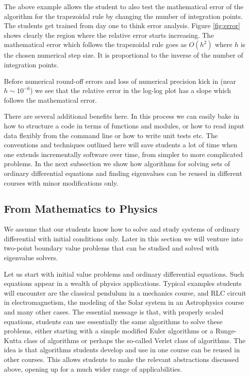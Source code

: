 \documentclass[graybox,envcountchap,sectrefs]{svmult}
\begin{document}
The above example allows the student to also test the mathematical
error of the algorithm for the trapezoidal rule by changing the number
of integration points. The students get trained from day one to think
error analysis. Figure \ref{fig:error}  shows clearly the region where the
relative error starts increasing.  The mathematical error which
follows the trapezoidal rule goes as $O(h^2)$ where $h$ is the chosen
numerical step size. It is proportional to the inverse of the number of integration points.

Before numerical round-off errors and loss of
numerical precision kick in (near $h\sim 10^{-6}$) we see that the
relative error in the log-log plot has a slope which follows the
mathematical error.

There are several additional benefits here. In
this process we can easily bake in how to structure a code in terms of
functions and modules, or how to read input data flexibly from the
command line or how to write unit tests etc.  The conventions and
techniques outlined here will save students a lot of time when one
extends incrementally software over time, from simpler to more
complicated problems. In the next subsection we show how algorithms
for solving sets of ordinary differential equations and finding
eigenvalues can be reused in different courses with minor
modifications only.



\subsection{From Mathematics to Physics}

We assume that our students know how to solve and study systems of
ordinary differential with initial conditions only. Later in this
section we will venture into two-point boundary value problems that
can be studied and solved with eigenvalue solvers.

Let us start with initial value problems and ordinary differential
equations. Such equations appear in a wealth of physics
applications. Typical examples students will encounter are the
classical pendulum in a mechanics course, and RLC circuit in
electromagnetism, the modeling of the Solar system in an Astrophysics
course and many other cases.  The essential message is that, with
properly scaled equations, students can use essentially the
same algorithms to solve these problems, either starting with
a simple modified Euler algorithms or a Runge-Kutta class of
algorithms or perhaps the so-called Verlet class of algorithms. The
idea is that algorithms students develop and use in one course can be
reused in other courses.  This allows  students to make the
relevant abstractions discussed above, opening up for a much wider
range of applicabilities.
\end{document}
